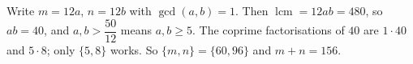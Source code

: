 Write $m=12a$, $n=12b$ with $\gcd(a,b)=1$. Then $\operatorname{lcm}=12ab=480$, so $ab=40$, and $a,b>\dfrac{50}{12}$ means $a,b\ge5$. The coprime factorisations of $40$ are $1\cdot40$ and $5\cdot8$; only $\{5,8\}$ works. So $\{m,n\}=\{60,96\}$ and $m+n=\boxed{156}$.
